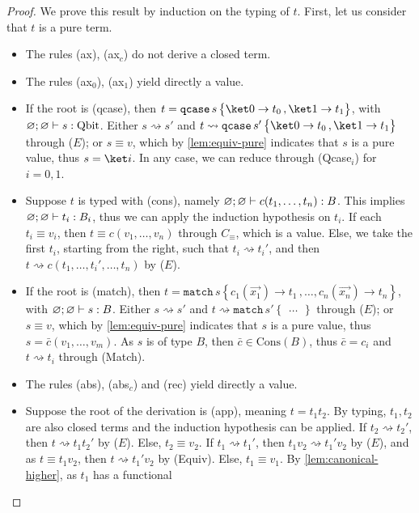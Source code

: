 \documentclass[10pt,a4paper]{article}
\newcommand{\bvar}{B}
\newcommand{\qbit}{\mathrm{Qbit}}
\newcommand{\cons}[1]{\mathrm{Cons}(#1)}
\newcommand{\textqcase}{\ensuremath{\mathtt{qcase}}}
\newcommand{\textmatch}{\ensuremath{\mathtt{match}}}
\newcommand{\zket}{\ket 0}
\newcommand{\oket}{\ket 1}
\newcommand{\qcasebase}[2]{
  \textqcase\,#1\left\{\! \begin{aligned} #2 \end{aligned}\right\}
}
\newcommand{\qcase}[3]{
  \qcasebase {#1} {\zket \to #2\,, \oket \to #3}
}
\newcommand{\match}[2]{
  \textmatch\,#1\left\{\! \begin{aligned} #2 \end{aligned}\right\}
}
\newcommand{\matchdefault}[1]{\textmatch\,#1 \left\{
    c_1(\overrightarrow{x_1}) \to t_1\,, \dots,
    c_n(\overrightarrow{x_n}) \to t_n
\right\}}
\newcommand{\equivcontext}{\ensuremath{C_\equiv}}
\newcommand{\typing}[4]{
  \ifx&#1&\varnothing \else #1\fi; 
  \ifx&#2&\varnothing \else #2\fi 
  \vdash {#3} : #4
}
\newcommand{\closedtyping}[2]{\typing{}{}{#1}{#2}}
\newcommand{\reduces}{\rightsquigarrow}
\newcommand{\evalcontext}{\ensuremath{E}}
\begin{document}
\begin{proof}
  We prove this result by induction on the typing of $t$.
  First, let us consider that $t$ is a pure term.

  \begin{itemize}
    \item The rules (ax), (ax$_c$) do not derive a closed term.
    \item The rules (ax$_0$), (ax$_1$) yield directly a value.
    \item If the root is (qcase), then $t = \qcase s {t_0}
      {t_1}$, with $\closedtyping{s}{\qbit}$.
      Either $s \reduces s'$ and $t \reduces \qcase {s'} {t_0}
      {t_1}$ through (\evalcontext);
      or $s \equiv v$, which by \autoref{lem:equiv-pure} indicates
      that $s$ is a pure value, thus $s = \ket i$.
      In any case, we can reduce through (Qcase$_i$) for $i = 0, 1$.
    \item Suppose $t$ is typed with (cons), namely
      $\closedtyping{c(t_1, \dots, t_n)}{\bvar}$.
      This implies $\closedtyping{t_i}{B_i}$, thus we can apply the
      induction hypothesis on $t_i$.
      If each $t_i \equiv v_i$, then $t \equiv c(v_1, \dots, v_n)$
      through \equivcontext, which is a value.
      Else, we take the first $t_i$, starting from the right, such
      that $t_i \reduces t_i'$, and then $t \reduces c(t_1, \dots,
      t_i',\dots, t_n)$ by (\evalcontext).
    \item If the root is (match), then $t = \matchdefault s$,
      with $\closedtyping{s}{\bvar}$.
      Either $s \reduces s'$ and $t \reduces \match {s'} \dots$
      through (\evalcontext);
      or $s \equiv v$, which by \autoref{lem:equiv-pure} indicates
      that $s$ is a pure value, thus $s = \bar c(v_1, \dots, v_m)$.
      As $s$ is of type $B$, then $\bar c \in \cons B$, thus $\bar c
      = c_i$ and $t \reduces t_i$ through (Match).
    \item The rules (abs), (abs$_c$) and (rec) yield directly a value.
    \item Suppose the root of the derivation is (app), meaning $t = t_1 t_2$.
      By typing, $t_1, t_2$ are also closed terms and the induction
      hypothesis can be applied.
      If $t_2 \reduces t_2'$, then $t \reduces t_1t_2'$ by (\evalcontext).
      Else, $t_2 \equiv v_2$.
      If $t_1 \reduces t_1'$, then $t_1v_2 \reduces t_1'v_2$ by
      (\evalcontext), and as $t \equiv t_1v_2$, then $t \reduces
      t_1'v_2$ by (Equiv).
      Else, $t_1 \equiv v_1$.
      By \autoref{lem:canonical-higher}, as $t_1$ has a functional

\end{itemize}
\end{proof}
\end{document}
